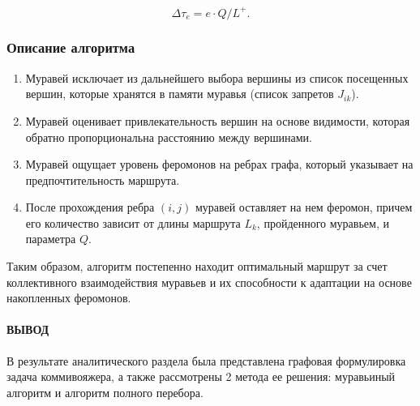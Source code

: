 \begin{equation}
    \label{elite_ant}
    \Delta \tau_{e} = e \cdot Q / L^{+}.
\end{equation}

\subsubsection*{Описание алгоритма}
\begin{enumerate}
    \item Муравей исключает из дальнейшего выбора вершины из список посещенных вершин, которые хранятся в памяти муравья (список запретов $J_{ik}$).
    \item Муравей оценивает привлекательность вершин на основе видимости, которая обратно пропорциональна расстоянию между вершинами.
    \item Муравей ощущает уровень феромонов на ребрах графа, который указывает на предпочтительность маршрута.
    \item После прохождения ребра $(i, j)$ муравей оставляет на нем феромон, причем его количество зависит от длины маршрута $L_k$, пройденного муравьем, и параметра $Q$.
\end{enumerate}

Таким образом, алгоритм постепенно находит оптимальный маршрут за счет коллективного взаимодействия муравьев и их способности к адаптации на основе накопленных феромонов.

\paragraph*{ВЫВОД} ${}$ \\

В результате аналитического раздела была представлена графовая формулировка задача коммивояжера, а также рассмотрены 2 метода ее решения: муравьиный алгоритм и алгоритм полного перебора.
